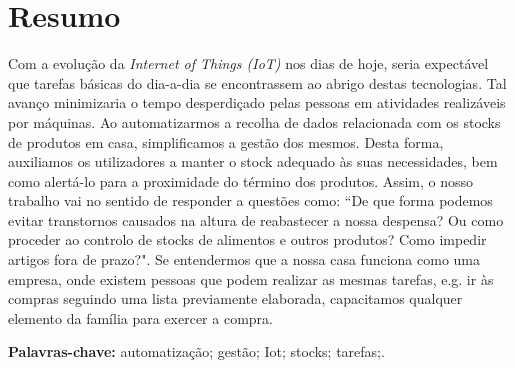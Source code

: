 \cleardoublepage\newpage
\chapter*{Resumo} \label{resumo}

Com a evolução da \textit{Internet of Things (IoT)} nos dias de hoje, seria expectável que tarefas básicas do dia-a-dia se encontrassem ao abrigo destas tecnologias. Tal avanço minimizaria o tempo desperdiçado pelas pessoas em atividades realizáveis por máquinas. Ao automatizarmos a recolha de dados relacionada com os stocks de produtos em casa, simplificamos a gestão dos mesmos. Desta forma, auxiliamos os utilizadores a manter o stock adequado às suas necessidades, bem como alertá-lo para a proximidade do término dos produtos. Assim, o nosso trabalho vai no sentido de responder a questões como: ``De que forma podemos evitar transtornos causados na altura de reabastecer a nossa despensa? Ou como proceder ao controlo de stocks de alimentos e outros produtos? Como impedir artigos fora de prazo?". Se entendermos que a nossa casa funciona como uma empresa, onde existem pessoas que podem realizar as mesmas tarefas, e.g. ir às compras seguindo uma lista previamente elaborada, capacitamos qualquer elemento da família para exercer a compra.

{\bf Palavras-chave:} automatização; gestão; Iot; stocks; tarefas;.